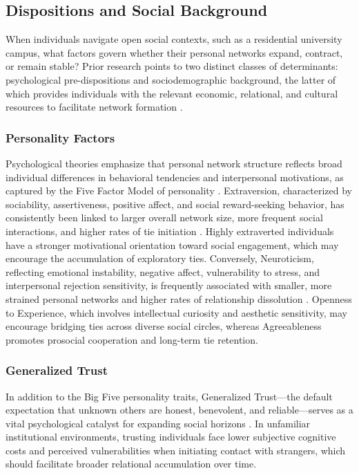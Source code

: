 \documentclass[12pt]{article}
\begin{document}
\subsection{Dispositions and Social Background}

When individuals navigate open social contexts, such as a residential university campus, what factors govern whether their personal networks expand, contract, or remain stable? Prior research points to two distinct classes of determinants: psychological pre-dispositions and sociodemographic background, the latter of which provides individuals with the relevant economic, relational, and cultural resources to facilitate network formation \citep{dimaggio2011how-2b9}.

\subsubsection{Personality Factors}
Psychological theories emphasize that personal network structure reflects broad individual differences in behavioral tendencies and interpersonal motivations, as captured by the Five Factor Model of personality \citep{costa1992four, roberts2007power}. Extraversion, characterized by sociability, assertiveness, positive affect, and social reward-seeking behavior, has consistently been linked to larger overall network size, more frequent social interactions, and higher rates of tie initiation \citep{asendorpf1998personality, centellegher2017personality, harris2016friendship}. Highly extraverted individuals have a stronger motivational orientation toward social engagement, which may encourage the accumulation of exploratory ties. Conversely, Neuroticism, reflecting emotional instability, negative affect, vulnerability to stress, and interpersonal rejection sensitivity, is frequently associated with smaller, more strained personal networks and higher rates of relationship dissolution \citep{russell2008personality}. Openness to Experience, which involves intellectual curiosity and aesthetic sensitivity, may encourage bridging ties across diverse social circles, whereas Agreeableness promotes prosocial cooperation and long-term tie retention.

\subsubsection{Generalized Trust}
In addition to the Big Five personality traits, Generalized Trust---the default expectation that unknown others are honest, benevolent, and reliable---serves as a vital psychological catalyst for expanding social horizons \citep{glaeser2000measuring, yamagishi2011trust}. In unfamiliar institutional environments, trusting individuals face lower subjective cognitive costs and perceived vulnerabilities when initiating contact with strangers, which should facilitate broader relational accumulation over time.
\end{document}
